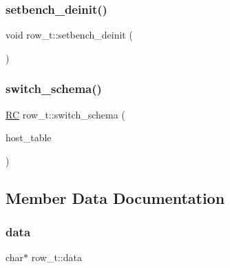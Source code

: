 \mbox{\label{classrow__t_acb30d289513df9c5db6f1775a0cf9312}} 
\subsubsection{\texorpdfstring{setbench\+\_\+deinit()}{setbench\_deinit()}}
{\footnotesize\ttfamily void row\+\_\+t\+::setbench\+\_\+deinit (\begin{DoxyParamCaption}{ }\end{DoxyParamCaption})}

\mbox{\label{classrow__t_af0228d195f82091abefa28d29ac83e22}} 
\subsubsection{\texorpdfstring{switch\+\_\+schema()}{switch\_schema()}}
{\footnotesize\ttfamily \hyperlink{global_8h_a78c49a674c810fdd03d20432f7be864a}{RC} row\+\_\+t\+::switch\+\_\+schema (\begin{DoxyParamCaption}\item[{\hyperlink{classtable__t}{table\+\_\+t} $\ast$}]{host\+\_\+table }\end{DoxyParamCaption})}



\subsection{Member Data Documentation}
\mbox{\label{classrow__t_a8d7d53132f2f84f46785805abec0614c}} 
\subsubsection{\texorpdfstring{data}{data}}
{\footnotesize\ttfamily char$\ast$ row\+\_\+t\+::data}

\mbox{\label{classrow__t_a456270f0f263ed713187d5738a7a6e4c}} 
